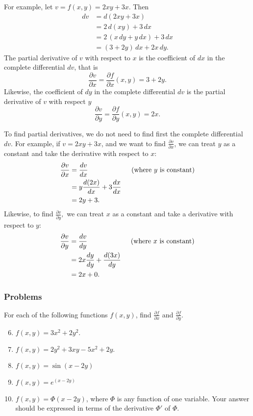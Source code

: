 \documentclass[polutonikogreek,english,twoside,openright]{article}
\begin{document}
For example, let $v = f(x,y)= 2xy + 3x.$  Then 
\begin{align*}
dv & = d(2xy + 3x)\\
& = 2\,d(xy) + 3\,dx\\
& = 2\,(x\,dy + y\,dx) + 3\,dx\\
& = (3 + 2y)\,dx + 2x\,dy.
\end{align*}
The partial derivative of $v$ with respect to $x$ is the coefficient
of $dx$ in the complete differential $dv$, that is
$$ \frac{\partial v}{\partial x}= \frac{\partial f}{\partial x} (x,y) = 3+2y.$$
Likewise, the coefficient of $dy$ in the complete differential $dv$ is
the partial derivative of $v$ with respect $y$
$$  \frac{\partial v}{\partial y} = \frac{\partial f}{\partial y} (x,y) = 2x.$$

To find partial derivatives, we do not need to find first the complete
differential $dv$.  For example, if $v= 2xy + 3x$, and we want to find
$\displaystyle \frac{\partial v}{\partial x}$, we can treat $y$ as a
constant and take the derivative with respect to $x$:
\begin{align*}
  \frac{\partial v}{\partial x}  & = \frac{dv}{dx} \text{\hspace{6em} (where $y$ is constant)}\\
                                 & = y \frac{d(2x)}{dx} + 3\frac{dx}{dx}\\
                                 & = 2y + 3.
\end{align*}
Likewise, to find $\displaystyle \frac{\partial v}{\partial y},$ we
can treat $x$ as a constant and take a derivative with respect to $y$:
\begin{align*}
  \frac{\partial v}{\partial y}  & = \frac{dv}{dy} \text{\hspace{6em} (where $x$ is constant)}\\
                                 & =  2x\frac{dy}{dy} + \frac{d(3x)}{dy}\\
                                 & = 2x +0.
\end{align*}

\subsubsection*{Problems}
For each of the following functions $f(x,y)$, find
$\displaystyle \frac{\partial f}{\partial x}$ and
$\displaystyle \frac{\partial f}{\partial y}$.
\begin{enumerate}
  \setcounter{enumi}{5}
\item $f(x,y) = 3x^2 + 2y^2.$
\item $f(x,y) = 2y^2 + 3xy - 5x^2 + 2y.$
\item $f(x,y) = \sin(x-2y)$
\item $f(x,y) = e^{(x-2y)}$
\item $f(x,y) = \Phi(x-2y)$, where $\Phi$ is any function of one
  variable.  Your answer should be expressed in terms of the
  derivative $\Phi'$ of $\Phi$.
\end{enumerate}
\end{document}
